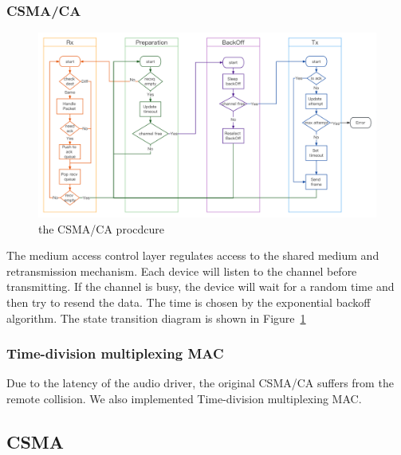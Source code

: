 \subsubsection{CSMA/CA}
\begin{figure}[h]
	\begin{center}
		\centerline{\includegraphics[width=\columnwidth]{./figures/CSMA.png}}
		\caption{the CSMA/CA procdcure}
		\label{csma}
	\end{center}
\end{figure}
The medium access control layer regulates access to the shared medium and retransmission mechanism. Each device will listen to the channel before transmitting. If the channel is busy, the device will wait for a random time and then try to resend the data. The time is chosen by the exponential backoff algorithm. The state transition diagram is shown in Figure~\ref{csma}

\subsubsection{Time-division multiplexing MAC}
Due to the latency of the audio driver, the original CSMA/CA suffers from the remote collision. We also implemented Time-division multiplexing MAC.

\subsection{CSMA}
